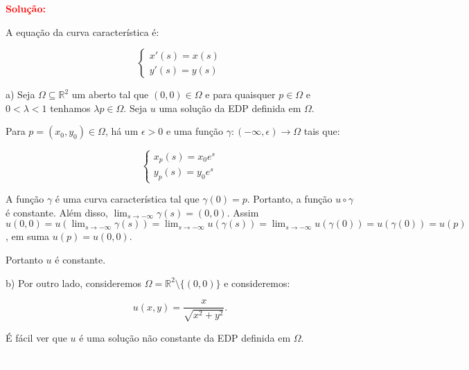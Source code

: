 \documentclass[11pt,a4paper]{article}
\newcommand{\solucao}[1]{\begin{mdframed}[style=MyFrame]
\textbf{\textcolor{red}{Solução:}} #1
\end{mdframed}\textcolor{white}{Oi} \newline}
\begin{document}
\solucao{

\noindent
A equação da curva característica é:

\[
\begin{cases}
    x'(s)=x(s) \\
    y'(s)=y(s)
\end{cases}
\]

\noindent
a) Seja $\Omega\subseteq\mathbb{R}^2$ um aberto tal que $(0,0)\in \Omega$ e para quaisquer $p\in\Omega$ e $0<\lambda<1$ tenhamos $\lambda p\in\Omega$. Seja $u$ uma solução da EDP definida em $\Omega$.

\medskip
\noindent
Para $p=(x_0,y_0)\in\Omega$, há um $\epsilon>0$ e uma função $\gamma:(-\infty,\epsilon)\rightarrow \Omega$ tais que:

\[
\begin{cases}
    x_p(s)=x_0e^s \\
    y_p(s)=y_0e^s
\end{cases}
\]

\noindent
A função $\gamma$ é uma curva característica tal que $\gamma(0)=p$. Portanto, a função $u\circ\gamma$ é constante. Além disso, $\lim_{s\rightarrow -\infty}\gamma(s)=(0,0)$. Assim $u(0,0)=u(\lim_{s\rightarrow -\infty}\gamma(s))=\lim_{s\rightarrow -\infty}u(\gamma(s))=\lim_{s\rightarrow -\infty}u(\gamma(0))=u(\gamma(0))=u(p)$, em suma $u(p)=u(0,0)$.

\medskip
\noindent
Portanto $u$ é constante.

\bigskip
\noindent
b) Por outro lado, consideremos $\Omega=\mathbb{R}^2\setminus\{(0,0)\}$ e consideremos:

\[
u(x,y)=\frac{x}{\sqrt{x^2+y^2}}.
\]

\noindent
É fácil ver que $u$ é uma solução não constante da EDP definida em $\Omega$.}
\end{document}
